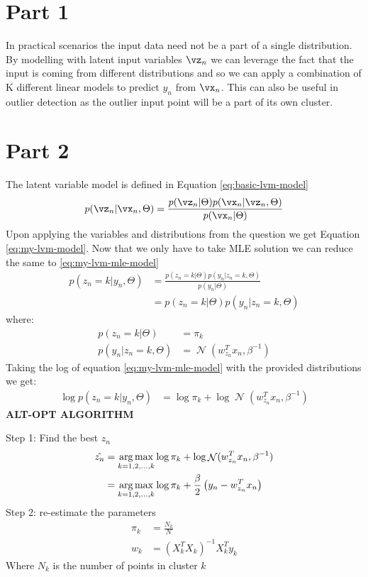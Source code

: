 \documentclass[a4paper,11pt]{article}
\begin{document}
\begin{mlsolution}

\section*{Part 1}
    In practical scenarios the input data need not be a part of a single distribution. By modelling with latent input variables $\vz_n$ we can leverage the fact that the input is coming from different distributions and so we can apply a combination of K different linear models to predict $y_n$ from $\vx_n$. This can also be useful in outlier detection as the outlier input point will be a part of its own cluster.
\section*{Part 2}
    The latent variable model is defined in Equation \ref{eq:basic-lvm-model}
    \begin{equation}
        \label{eq:basic-lvm-model}
        p(\vz_n|\vx_n,\Theta) = \frac{p(\vz_n|\Theta)p(\vx_n|\vz_n,\Theta)}{p(\vx_n|\Theta)}
    \end{equation}
    Upon applying the variables and distributions from the question we get Equation \ref{eq:my-lvm-model}. Now that we only have to take MLE solution we can reduce the same to \ref{eq:my-lvm-mle-model}
    \begin{align}
        p(z_n=k|y_n,\Theta) &= \frac{p(z_n=k|\Theta)p(y_n|z_n=k,\Theta)}{p(y_n|\Theta)} \label{eq:my-lvm-model} \\
        &= p(z_n=k|\Theta)p(y_n|z_n=k,\Theta) \label{eq:my-lvm-mle-model}
    \end{align}
    where:
    \begin{align}
        p(z_n=k|\Theta) &= \pi_k \\
        p(y_n|z_n=k,\Theta) &= \mathop{\mathcal{N}}(w^T_{z_n}x_n, \beta^{-1})
    \end{align}
    Taking the log of equation \ref{eq:my-lvm-mle-model} with the provided distributions we get:
    \begin{align}
        \log{p(z_n=k|y_n,\Theta)} &= \log{\pi_k} + \log{\mathop{\mathcal{N}}(w^T_{z_n}x_n, \beta^{-1})}
    \end{align}
    \textbf{ALT-OPT ALGORITHM}

    \noindent Step 1: Find the best $z_n$
    \begin{align}
        \hat{z_n} &= \mathop{\arg\max}_{k=1,2,...,k} \log{\pi_k} + \log{\mathop{\mathcal{N}}(w^T_{z_n}x_n, \beta^{-1})}\\
        &= \mathop{\arg\max}_{k=1,2,...,k} \log{\pi_k} + \frac{\beta}{2}\left({y_n-w^T_{z_n}x_n}\right)
    \end{align}
    Step 2: re-estimate the parameters
    \begin{align}
        \pi_k &= \frac{N_k}{N}\\
        w_k &= (X^T_kX_k)^{-1}X^T_ky_k
    \end{align}
    Where $N_k$ is the number of points in cluster $k$
    
\end{mlsolution}
	
\end{document}
